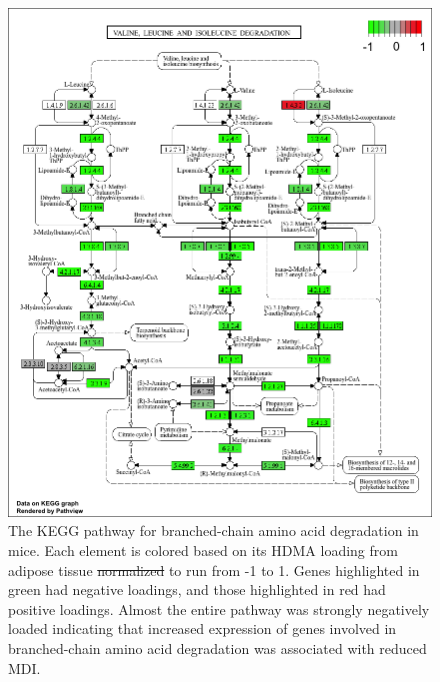 \documentclass[
]{article}
\providecommand{\DIFaddtex}[1]{{\protect\color{blue}\uwave{#1}}} %
\providecommand{\DIFdeltex}[1]{{\protect\color{red}\sout{#1}}}                      %
\providecommand{\DIFaddFL}[1]{\DIFadd{#1}} %
\providecommand{\DIFdelFL}[1]{\DIFdel{#1}} %
\providecommand{\DIFaddbeginFL}{} %
\providecommand{\DIFaddendFL}{} %
\providecommand{\DIFdelbeginFL}{} %
\providecommand{\DIFdelendFL}{} %
\providecommand{\DIFadd}[1]{\texorpdfstring{\DIFaddtex{#1}}{#1}} %
\providecommand{\DIFdel}[1]{\texorpdfstring{\DIFdeltex{#1}}{}} %
\newcommand{\DIFscaledelfig}{0.5}
\newlength{\DIFdelgraphicswidth} %
\newlength{\DIFdelgraphicsheight} %
\newcommand{\DIFaddincludegraphics}[2][]{{\color{blue}\fbox{\DIFOincludegraphics[#1]{#2}}}} %
\newcommand{\DIFdelincludegraphics}[2][]{%
\sbox{\DIFdelgraphicsbox}{\DIFOincludegraphics[#1]{#2}}%
\settoboxwidth{\DIFdelgraphicswidth}{\DIFdelgraphicsbox} %
\settoboxtotalheight{\DIFdelgraphicsheight}{\DIFdelgraphicsbox} %
\scalebox{\DIFscaledelfig}{%
\parbox[b]{\DIFdelgraphicswidth}{\usebox{\DIFdelgraphicsbox}\\[-\baselineskip] \rule{\DIFdelgraphicswidth}{0em}}\llap{\resizebox{\DIFdelgraphicswidth}{\DIFdelgraphicsheight}{%
\setlength{\unitlength}{\DIFdelgraphicswidth}%
\begin{picture}(1,1)%
\thicklines\linethickness{2pt} %
{\color[rgb]{1,0,0}\put(0,0){\framebox(1,1){}}}%
{\color[rgb]{1,0,0}\put(0,0){\line( 1,1){1}}}%
{\color[rgb]{1,0,0}\put(0,1){\line(1,-1){1}}}%
\end{picture}%
}\hspace*{3pt}}} %
} %
\DeclareRobustCommand{\DIFaddbeginFL}{\DIFOaddbeginFL \let\includegraphics\DIFaddincludegraphics} %
\DeclareRobustCommand{\DIFaddendFL}{\DIFOaddendFL \let\includegraphics\DIFOincludegraphics} %
\DeclareRobustCommand{\DIFdelbeginFL}{\DIFOdelbeginFL \let\includegraphics\DIFdelincludegraphics} %
\DeclareRobustCommand{\DIFdelendFL}{\DIFOaddendFL \let\includegraphics\DIFOincludegraphics} %
\begin{document}
\begin{figure}[ht!]
\includegraphics[width=\textwidth]{Figures/Supp_Fig_Branched_Chain.png} 
\caption{The KEGG pathway for branched-chain amino acid degradation in 
mice. Each element is colored based on its HDMA loading from adipose
tissue \DIFdelbeginFL \DIFdelFL{normalized }\DIFdelendFL \DIFaddbeginFL \DIFaddFL{scaled }\DIFaddendFL to run from -1 to 1. Genes highlighted in green had 
negative loadings, and those highlighted in red had positive loadings. 
Almost the entire pathway was strongly negatively loaded indicating 
that increased expression of genes involved in branched-chain amino acid 
degradation was associated with reduced MDI.
}
\label{fig:bcaa_degrataion}
\end{figure}
\end{document}
